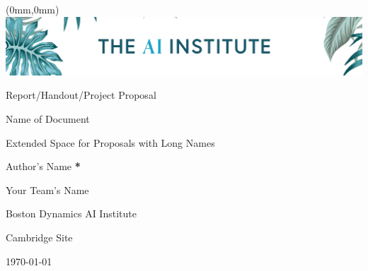 \documentclass[../bdaii-sample-handout.tex]{subfiles}
\begin{document}
\begin{titlepage}
\begin{textblock*}{\paperwidth}(0mm,0mm)
    \noindent
    \includegraphics[width=\paperwidth]{graphics/channels4_banner_nb.jpg}
\end{textblock*}
\makeatletter
\renewcommand{\thefootnote}{\@fnsymbol\c@footnote}
\makeatother
\setlength{\parindent}{0pt}

\null
\vspace{20em}
{\large Report/Handout/Project Proposal\par}
\vspace{\baselineskip}
{\LARGE Name of Document \par}
{\Large Extended Space for Proposals with Long Names \par}
\vspace{2\baselineskip}

{\large Author's Name \textbf{*}\par} 
{{Your Team's Name} \par}
\vspace{\baselineskip}

\vspace{12\baselineskip}
{{Boston Dynamics AI Institute} \par} 
{{Cambridge Site} \par} 
\today\par
{}
\end{titlepage}
\end{document}
